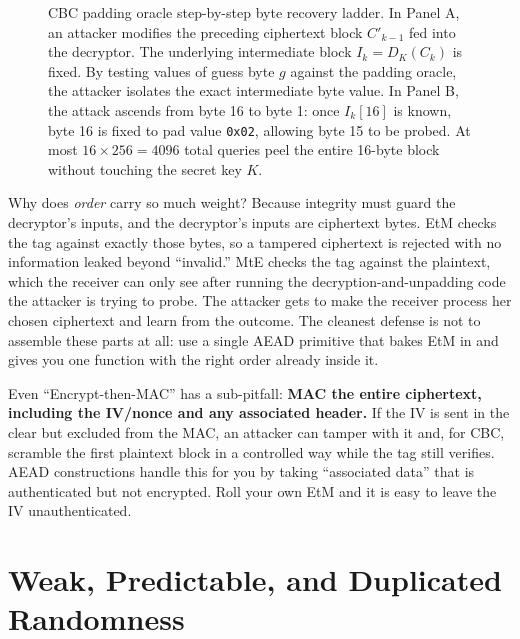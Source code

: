 \begin{figure}[H]
\caption{CBC padding oracle step-by-step byte recovery ladder. In Panel A, an attacker modifies the preceding ciphertext block $C'_{k-1}$ fed into the decryptor. The underlying intermediate block $I_k = D_K(C_k)$ is fixed. By testing values of guess byte $g$ against the padding oracle, the attacker isolates the exact intermediate byte value. In Panel B, the attack ascends from byte 16 to byte 1: once $I_k[16]$ is known, byte 16 is fixed to pad value \texttt{0x02}, allowing byte 15 to be probed. At most $16 \times 256 = 4096$ total queries peel the entire 16-byte block without touching the secret key $K$.}
\label{ch38:fig-padding-ladder}
\end{figure}

\begin{whybox}
Why does \emph{order} carry so much weight? Because integrity must guard the decryptor's inputs, and the decryptor's inputs are ciphertext bytes. EtM checks the tag against exactly those bytes, so a tampered ciphertext is rejected with no information leaked beyond ``invalid.'' MtE checks the tag against the plaintext, which the receiver can only see after running the decryption-and-unpadding code the attacker is trying to probe. The attacker gets to make the receiver process her chosen ciphertext and learn from the outcome. The cleanest defense is not to assemble these parts at all: use a single AEAD primitive that bakes EtM in and gives you one function with the right order already inside it.
\end{whybox}

\begin{trapbox}
Even ``Encrypt-then-MAC'' has a sub-pitfall: \textbf{MAC the entire ciphertext, including the IV/nonce and any associated header.} If the IV is sent in the clear but excluded from the MAC, an attacker can tamper with it and, for CBC, scramble the first plaintext block in a controlled way while the tag still verifies. AEAD constructions handle this for you by taking ``associated data'' that is authenticated but not encrypted. Roll your own EtM and it is easy to leave the IV unauthenticated.
\end{trapbox}

\section{Weak, Predictable, and Duplicated Randomness}
\label{ch38:randomness}

